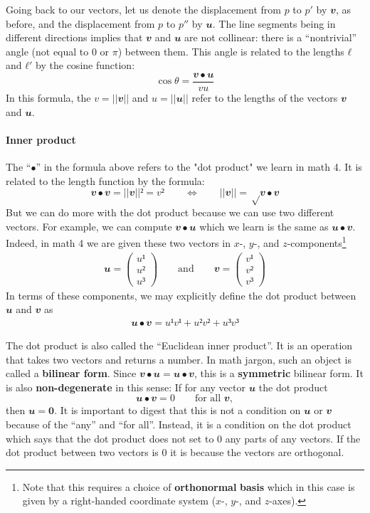 Going back to our vectors, let us denote the displacement from $p$ to $p'$ by $𝒗$, as before, and the displacement from $p$ to $p''$ by $𝒖$. The line segments being in different directions implies that $𝒗$ and $𝒖$ are not collinear: there is a “nontrivial” angle (\ie{}not equal to $0$ or $π$) between them. This angle is related to the lengths $ℓ$ and $ℓ'$ by the cosine function:
$$
\cos θ = \frac{𝒗 ∙ 𝒖}{vu}
$$
In this formula, the $v=|| 𝒗 ||$ and $u=|| 𝒖 ||$ refer to the lengths of the vectors $𝒗$ and $𝒖$.

\paragraph{Inner product}
The “$∙$” in the formula above refers to the "dot product" we learn in math 4. It is related to the length function by the formula:
$$
𝒗 ∙ 𝒗 = ||𝒗||² = v² 
\quad \quad ⇔ \quad \quad
||𝒗|| = √{𝒗 ∙ 𝒗}
$$
But we can do more with the dot product because we can use two different vectors. For example, we can compute $𝒗 ∙ 𝒖$ which we learn is the same as $𝒖 ∙ 𝒗$. Indeed, in math 4 we are given these two vectors in $x$-, $y$-, and $z$-components\footnote{Note that this requires a choice of {\bf orthonormal} {\bf basis} which in this case is given by a right-handed coordinate system ($x$-, $y$-, and $z$-axes).} 
\begin{eqnarray}\label{components}
𝒖 = \left( \begin{array}{c}u¹ \\ u² \\ u³ \end{array}\right)
\quad \quad {\mathrm{and}} \quad \quad
𝒗 = \left( \begin{array}{c}v¹ \\ v² \\ v³ \end{array}\right)
\end{eqnarray}
In terms of these components, we may explicitly define the dot product between $𝒖$ and $𝒗$ as 
\begin{eqnarray}
\label{Euclid}
𝒖 ∙ 𝒗 = u¹v¹ + u²v² +u³v³ 
\end{eqnarray}

The dot product is also called the “Euclidean inner product”. It is an operation that takes two vectors and returns a number. In math jargon, such an object is called a {\bf bilinear form}. Since $𝒗 ∙ 𝒖 = 𝒖 ∙ 𝒗$, this is a {\bf symmetric} bilinear form. It is also {\bf non-degenerate} in this sense: If for any vector $𝒖$ the dot product
$$
𝒖 ∙ 𝒗 = 0   	\quad \quad \textrm{for all } 𝒗,
$$
then $𝒖=𝟎$. It is important to digest that this is not a condition on $𝒖$ or $𝒗$ because of the “any” and “for all”. Instead, it is a condition on the dot product which says that the dot product does not set to 0 any parts of any vectors. If the dot product between two vectors is $0$ it is because the vectors are orthogonal. 

